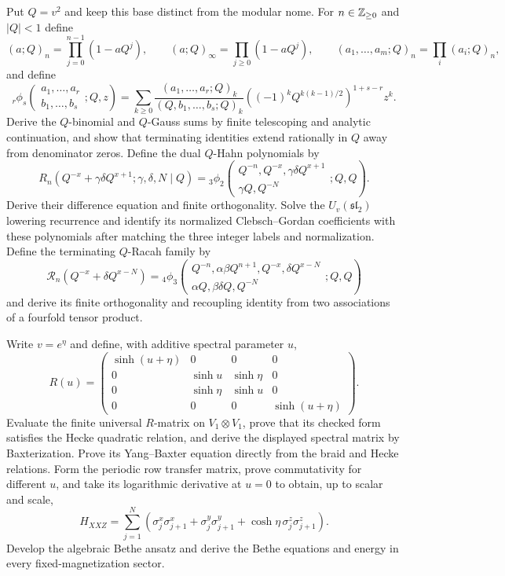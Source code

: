 \begin{exercise}
Put $Q=v^2$ and keep this base distinct from the modular nome.  For
$n\in\mathbb Z_{\geq0}$ and $|Q|<1$ define
\[
 (a;Q)_n=\prod_{j=0}^{n-1}(1-aQ^j),\qquad
 (a;Q)_\infty=\prod_{j\geq0}(1-aQ^j),
 \qquad (a_1,\ldots,a_m;Q)_n=\prod_i(a_i;Q)_n,
\]
and define
\[
 {}_r\phi_s\!\left(\begin{matrix}a_1,\ldots,a_r\\
 b_1,\ldots,b_s\end{matrix};Q,z\right)
 =\sum_{k\ge0}\frac{(a_1,\ldots,a_r;Q)_k}
 {(Q,b_1,\ldots,b_s;Q)_k}
 \left((-1)^kQ^{k(k-1)/2}\right)^{1+s-r}z^k.
\]
Derive the $Q$-binomial and $Q$-Gauss sums by finite telescoping and analytic
continuation, and show that terminating identities extend rationally in $Q$
away from denominator zeros.  Define the dual $Q$-Hahn polynomials by
\[
 R_n(Q^{-x}+\gamma\delta Q^{x+1};\gamma,\delta,N\mid Q)
 ={}_3\phi_2\!\left(\begin{matrix}Q^{-n},Q^{-x},
 \gamma\delta Q^{x+1}\\ \gamma Q,Q^{-N}
 \end{matrix};Q,Q\right).
\]
Derive their difference equation and finite orthogonality.  Solve the
$U_v(\mathfrak{sl}_2)$ lowering recurrence and identify its normalized
Clebsch--Gordan coefficients with these polynomials after matching the three
integer labels and normalization.  Define the terminating $Q$-Racah family by
\[
 \mathcal R_n(Q^{-x}+\delta Q^{x-N})
 ={}_4\phi_3\!\left(\begin{matrix}
 Q^{-n},\alpha\beta Q^{n+1},Q^{-x},\delta Q^{x-N}\\
 \alpha Q,\beta\delta Q,Q^{-N}
 \end{matrix};Q,Q\right)
\]
and derive its finite orthogonality and recoupling identity from two
associations of a fourfold tensor product.
\end{exercise}

\begin{exercise}
Write $v=e^\eta$ and define, with additive spectral parameter $u$,
\[
 R(u)=\begin{pmatrix}
 \sinh(u+\eta)&0&0&0\\
 0&\sinh u&\sinh\eta&0\\
 0&\sinh\eta&\sinh u&0\\
 0&0&0&\sinh(u+\eta)
\end{pmatrix}.
\]
Evaluate the finite universal $R$-matrix on $V_1\otimes V_1$, prove that its
checked form satisfies the Hecke quadratic relation, and derive the displayed
spectral matrix by Baxterization.  Prove its Yang--Baxter equation directly
from the braid and Hecke relations.  Form the periodic row transfer matrix, prove
commutativity for different $u$, and take its logarithmic derivative at
$u=0$ to obtain, up to scalar and scale,
\[
 H_{XXZ}=\sum_{j=1}^N
 (\sigma_j^x\sigma_{j+1}^x+\sigma_j^y\sigma_{j+1}^y
 +\cosh\eta\,\sigma_j^z\sigma_{j+1}^z).
\]
Develop the algebraic Bethe ansatz and derive the Bethe equations and energy
in every fixed-magnetization sector.
\end{exercise}

